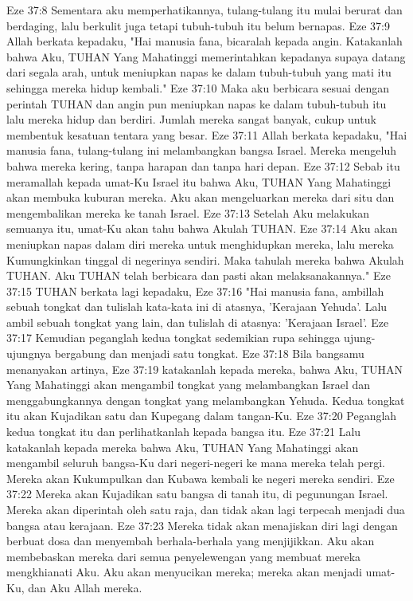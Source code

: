 Eze 37:8  Sementara aku memperhatikannya, tulang-tulang itu mulai berurat dan berdaging, lalu berkulit juga tetapi tubuh-tubuh itu belum bernapas.
Eze 37:9  Allah berkata kepadaku, "Hai manusia fana, bicaralah kepada angin. Katakanlah bahwa Aku, TUHAN Yang Mahatinggi memerintahkan kepadanya supaya datang dari segala arah, untuk meniupkan napas ke dalam tubuh-tubuh yang mati itu sehingga mereka hidup kembali."
Eze 37:10  Maka aku berbicara sesuai dengan perintah TUHAN dan angin pun meniupkan napas ke dalam tubuh-tubuh itu lalu mereka hidup dan berdiri. Jumlah mereka sangat banyak, cukup untuk membentuk kesatuan tentara yang besar.
Eze 37:11  Allah berkata kepadaku, "Hai manusia fana, tulang-tulang ini melambangkan bangsa Israel. Mereka mengeluh bahwa mereka kering, tanpa harapan dan tanpa hari depan.
Eze 37:12  Sebab itu meramallah kepada umat-Ku Israel itu bahwa Aku, TUHAN Yang Mahatinggi akan membuka kuburan mereka. Aku akan mengeluarkan mereka dari situ dan mengembalikan mereka ke tanah Israel.
Eze 37:13  Setelah Aku melakukan semuanya itu, umat-Ku akan tahu bahwa Akulah TUHAN.
Eze 37:14  Aku akan meniupkan napas dalam diri mereka untuk menghidupkan mereka, lalu mereka Kumungkinkan tinggal di negerinya sendiri. Maka tahulah mereka bahwa Akulah TUHAN. Aku TUHAN telah berbicara dan pasti akan melaksanakannya."
Eze 37:15  TUHAN berkata lagi kepadaku,
Eze 37:16  "Hai manusia fana, ambillah sebuah tongkat dan tulislah kata-kata ini di atasnya, 'Kerajaan Yehuda'. Lalu ambil sebuah tongkat yang lain, dan tulislah di atasnya: 'Kerajaan Israel'.
Eze 37:17  Kemudian peganglah kedua tongkat sedemikian rupa sehingga ujung-ujungnya bergabung dan menjadi satu tongkat.
Eze 37:18  Bila bangsamu menanyakan artinya,
Eze 37:19  katakanlah kepada mereka, bahwa Aku, TUHAN Yang Mahatinggi akan mengambil tongkat yang melambangkan Israel dan menggabungkannya dengan tongkat yang melambangkan Yehuda. Kedua tongkat itu akan Kujadikan satu dan Kupegang dalam tangan-Ku.
Eze 37:20  Peganglah kedua tongkat itu dan perlihatkanlah kepada bangsa itu.
Eze 37:21  Lalu katakanlah kepada mereka bahwa Aku, TUHAN Yang Mahatinggi akan mengambil seluruh bangsa-Ku dari negeri-negeri ke mana mereka telah pergi. Mereka akan Kukumpulkan dan Kubawa kembali ke negeri mereka sendiri.
Eze 37:22  Mereka akan Kujadikan satu bangsa di tanah itu, di pegunungan Israel. Mereka akan diperintah oleh satu raja, dan tidak akan lagi terpecah menjadi dua bangsa atau kerajaan.
Eze 37:23  Mereka tidak akan menajiskan diri lagi dengan berbuat dosa dan menyembah berhala-berhala yang menjijikkan. Aku akan membebaskan mereka dari semua penyelewengan yang membuat mereka mengkhianati Aku. Aku akan menyucikan mereka; mereka akan menjadi umat-Ku, dan Aku Allah mereka.
